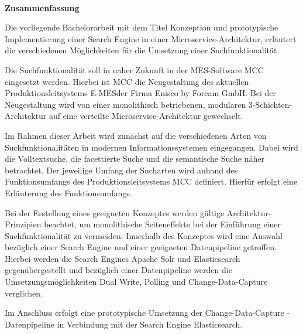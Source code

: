 
~

\vspace{17.1mm}

\begin{flushleft}
    \textbf{\huge{}Zusammenfassung}{\huge\par}
\par\end{flushleft}

Die vorliegende Bachelorarbeit mit dem Titel \glqq Konzeption und prototypische Implementierung einer Search Engine in einer Microservice-Architektur\grqq{}, erläutert die verschiedenen Möglichkeiten für die Umsetzung einer Suchfunktionalität. 

Die Suchfunktionalität soll in naher Zukunft in der MES-Software \glqq MCC\grqq{} eingesetzt werden. Hierbei ist \glqq MCC\grqq{} die Neugestaltung des aktuellen Produktionsleitsystems \glqq E-MES\grqq der Firma Enisco by Forcam GmbH. Bei der Neugestaltung wird von einer monolithisch betriebenen, modularen 3-Schichten-Architektur auf eine verteilte Microservice-Architektur gewechselt.

Im Rahmen dieser Arbeit wird zunächst auf die verschiedenen Arten von Suchfunktionalitäten in modernen Informationssystemen eingegangen. Dabei wird die Volltextsuche, die facettierte Suche und die semantische Suche näher betrachtet. Der jeweilige Umfang der Sucharten wird anhand des Funktionsumfangs des Produktionsleitsystems \glqq MCC\grqq{} definiert. Hierfür erfolgt eine Erläuterung des Funktionsumfangs.

Bei der Erstellung eines geeigneten Konzeptes werden gültige Architektur-Prinzipien beachtet, um monolithische Seiteneffekte bei der Einführung einer Suchfunktionalität zu vermeiden. Innerhalb des Konzeptes wird eine Auswahl bezüglich einer Search Engine und einer geeigneten Datenpipeline getroffen. Hierbei werden die Search Engines \glqq Apache Solr\grqq{} und \glqq Elasticsearch\grqq{} gegenübergestellt und bezüglich einer Datenpipeline werden die Umsetzungsmöglichkeiten \glqq Dual Write\grqq{}, \glqq Polling\grqq{} und \glqq Change-Data-Capture\grqq{} verglichen.

Im Anschluss erfolgt eine prototypische Umsetzung der Change-Data-Capture - Datenpipeline in Verbindung mit der Search Engine \glqq Elasticsearch\grqq{}.
